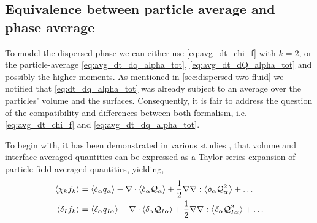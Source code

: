
\subsection{Equivalence between particle average and phase average}

To model the dispersed phase we can either use \ref{eq:avg_dt_chi_f} with $k=2$, or the particle-average \ref{eq:avg_dt_dq_alpha_tot}, \ref{eq:avg_dt_dQ_alpha_tot} and possibly the higher moments. 
As mentioned in \ref{sec:dispersed-two-fluid} we notified that \ref{eq:dt_dq_alpha_tot} was already subject to an average over the particles' volume and the surfaces. 
Consequently, it is fair to address the question of the compatibility and differences  between both formalism, i.e. \ref{eq:avg_dt_chi_f} and \ref{eq:avg_dt_dq_alpha_tot}. 

To begin with, it has been demonstrated in various studies \citep{nott2011suspension,jackson1997locally,zhang1994averaged}, that volume and interface averaged quantities can be expressed as a Taylor series expansion of particle-field averaged quantities, yielding, 
\begin{align}
    \left<\chi_kf_k\right> 
    &=  \left<\delta_\alpha q_\alpha\right>
        - \mathbf{\nabla} \cdot  
        \left<\delta_\alpha \mathcal{Q}_\alpha\right>        
        + \frac{1}{2} \mathbf{\nabla}\mathbf{\nabla} : \left<\delta_\alpha \mathcal{Q}_\alpha^2\right>
        + \ldots  \\
    \left<\delta_I f_k\right> 
    &=  \left<\delta_\alpha q_{I\alpha}\right>        
        - \mathbf{\nabla} \cdot \left<\delta_\alpha \mathcal{Q}_{I\alpha}\right>
        + \frac{1}{2} \mathbf{\nabla}\mathbf{\nabla} : \left<\delta_\alpha \mathcal{Q}_{I\alpha}^{2}\right>
        + \ldots  
    \label{eq:f_exp}
\end{align}

